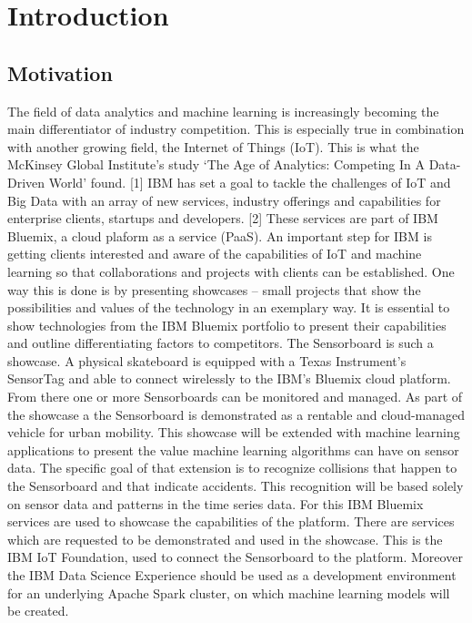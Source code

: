 \chapter{Introduction}
\label{ch:Introduction}

\section{Motivation}
\label{sec:Motivation}
The field\cite{zitat1} of data analytics and machine learning is increasingly becoming the main differentiator of industry competition. This is especially true in combination with another growing field, the Internet of Things (IoT). This is what the McKinsey Global Institute’s study ‘The Age of Analytics: Competing In A Data-Driven World’ found. [1] IBM has set a goal to tackle the challenges of IoT and Big Data with an array of new services, industry offerings and capabilities for enterprise clients, startups and developers. [2] These services are part of IBM Bluemix, a cloud plaform  as a service (PaaS). 
\newline
An important step for IBM is getting clients interested and aware of the capabilities of IoT and machine learning so that collaborations and projects with clients can be established. One way this is done is by presenting showcases – small projects that show the possibilities and values of the technology in an exemplary way. It is essential to show technologies from the IBM Bluemix portfolio to present their capabilities and outline differentiating factors to competitors.
 \newline
The Sensorboard is such a showcase. A physical skateboard is equipped with a Texas Instrument’s SensorTag and able to connect wirelessly to the IBM's Bluemix cloud platform. From there one or more Sensorboards can be monitored and managed. As part of the showcase a the Sensorboard is demonstrated as a rentable and cloud-managed vehicle for urban mobility.
 \newline
This showcase will be extended with machine learning applications to present the value machine learning algorithms can have on sensor data. The specific goal of that extension is to recognize collisions that happen to the Sensorboard and that indicate accidents. This recognition will be based solely on sensor data and  patterns in the time series data. For this IBM Bluemix services are used to showcase the capabilities of the platform. There are services which are requested to be demonstrated and used in the showcase. This is the IBM IoT Foundation, used to connect the Sensorboard to the platform. Moreover the IBM Data Science Experience should be used as a development environment for an underlying Apache Spark cluster, on which machine learning models will be created.

